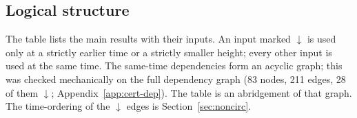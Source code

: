 \subsection{Logical structure}\label{sec:logic}
The table lists the main results with their inputs. An input marked $\downarrow$ is used only at a strictly earlier time or a
strictly smaller height; every other input is used at the same time. The same-time dependencies form an acyclic graph; this was
checked mechanically on the full dependency graph (83 nodes, 211 edges, 28 of them $\downarrow$; Appendix~\ref{app:cert-dep}).
The table is an abridgement of that graph. The
time-ordering of the $\downarrow$ edges is Section~\ref{sec:noncirc}.
